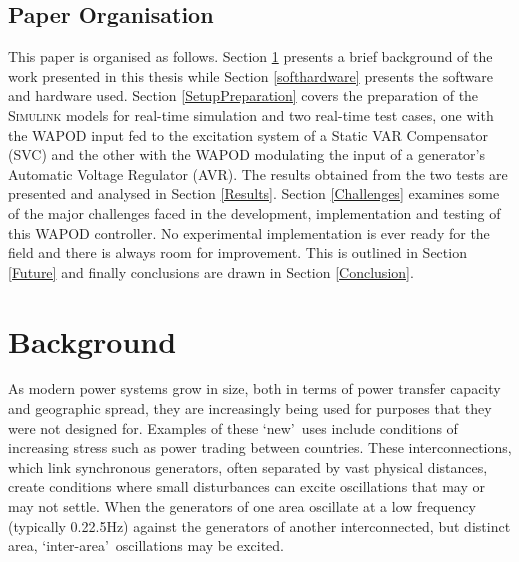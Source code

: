 \documentclass[journal]{IEEEtran}
\begin{document}

\subsection{Paper Organisation}

This paper is organised as follows. Section \ref{Background} presents a brief background of the work presented in this thesis while Section \ref{softhardware} presents the software and hardware used. Section \ref{SetupPreparation} covers the preparation of the \textsc{Simulink} models for real-time simulation and two real-time test cases, one with the WAPOD input fed to the excitation system of a Static VAR Compensator (SVC) and the other with the WAPOD modulating the input of a generator\rq{s} Automatic Voltage Regulator (AVR). The results obtained from the two tests are presented and analysed in Section \ref{Results}. Section \ref{Challenges} examines some of the major challenges faced in the development, implementation and testing of this WAPOD controller. No experimental implementation is ever ready for the field and there is always room for improvement. This is outlined in Section \ref{Future} and finally conclusions are drawn in Section \ref{Conclusion}.
\section{Background}\label{Background}
As modern power systems grow in size, both in terms of power transfer capacity and geographic spread, they are increasingly being used for purposes that they were not designed for. Examples of these \textquoteleft new\textquoteright ~uses include conditions of increasing stress such as power trading between countries. These interconnections, which link synchronous generators, often separated by vast physical distances, create conditions where small disturbances can excite oscillations that may or may not settle. When the generators of one area oscillate at a low frequency (typically 0.2\textendash 2.5Hz) against the generators of another interconnected, but distinct area, \textquoteleft inter-area\textquoteright ~oscillations may be excited.
\end{document}
